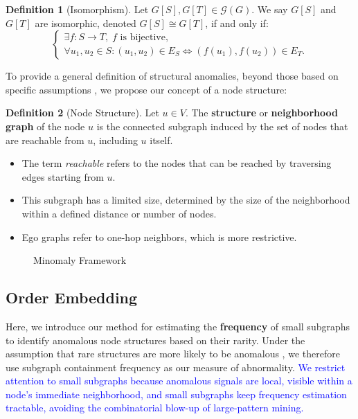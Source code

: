 \documentclass[preprint,12pt]{elsarticle}
\newcommand{\new}[1]{\textcolor{blue}{#1}}
\theoremstyle{plain}
\theoremstyle{definition}
\newtheorem{definition}{Definition}
\theoremstyle{remark}
\begin{document}
\begin{definition}[Isomorphism]
Let $G[S], G[T] \in \mathcal{G}(G)$. We say $G[S]$ and $G[T]$ are isomorphic, denoted $G[S] \cong G[T]$, if and only if:
\[
\begin{cases}
    \exists f: S \to T, \; f \text{ is bijective}, \\
    \forall u_1, u_2 \in S: (u_1, u_2) \in E_S \iff (f(u_1), f(u_2)) \in E_T.
\end{cases}
\]
\label{def:isomorphism}
\end{definition}

To provide a general definition of structural anomalies, beyond those based on specific assumptions \cite{NEURIPS2022-acc1ec4a,bandyopadhyay2020outlier,xu2022contrastive,yuan2024higherorder}, we propose our concept of a node structure:

\begin{definition}[Node Structure]
\label{def:node_structure}
Let $u \in V$. The \textbf{structure} or \textbf{neighborhood graph} of the node $u$ is the connected subgraph induced by the set of nodes that are reachable from $u$, including $u$ itself.
\begin{itemize}
    \item The term \textit{reachable} refers to the nodes that can be reached by traversing edges starting from $u$.
    \item This subgraph has a limited size, determined by the size of the neighborhood within a defined distance or number of nodes.
    \item Ego graphs refer to one-hop neighbors, which is more restrictive.
\end{itemize}
\end{definition}

\begin{figure}[htbp]
    \centering
    \resizebox{\linewidth}{!}{}
    \caption{Minomaly Framework}
    \label{fig:framework}
\end{figure}

\subsection{Order Embedding}

Here, we introduce our method for estimating the \textbf{frequency} of small subgraphs to identify anomalous node structures based on their rarity. Under the assumption that rare structures are more likely to be anomalous \cite{Ruff_2021}, we therefore use subgraph containment frequency as our measure of abnormality. \new{We restrict attention to small subgraphs because anomalous signals are local, visible within a node's immediate neighborhood, and small subgraphs keep frequency estimation tractable, avoiding the combinatorial blow-up of large-pattern mining.}
\end{document}

